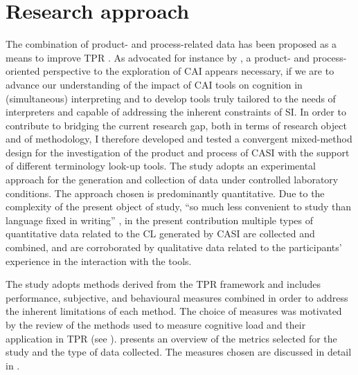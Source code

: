 \section{Research approach} \label{approach}
The combination of product- and process-related data has been proposed as a means to improve TPR \citep{hansen_2007}. As advocated for instance by \citet{mellinger_computer-assisted_2019}, a product- and process-oriented perspective to the exploration of CAI appears necessary, if we are to advance our understanding of the impact of CAI tools on cognition in (simultaneous) interpreting and to develop tools truly tailored to the needs of interpreters and capable of addressing the inherent constraints of SI. In order to contribute to bridging the current research gap, both in terms of research object and of methodology, I therefore developed and tested a convergent mixed-method design for the investigation of the product and process of CASI with the support of different terminology look-up tools. The study adopts an experimental approach for the generation and collection of data under controlled laboratory conditions. The approach chosen is predominantly quantitative. Due to the complexity of the present object of study, ``so much less convenient to study than language fixed in writing'' \citep[48]{pochhacker_introducing_2004}, in the present contribution
multiple types of quantitative data related to the CL generated by CASI are collected and combined, and are corroborated by qualitative data related to the participants' experience in the interaction with the tools.

The study adopts methods derived from the TPR framework and includes performance, subjective, and behavioural measures combined in order to address the inherent limitations of each method. The choice of measures was motivated by the review of the methods used to measure cognitive load and their application in TPR (see ).  presents an overview of the metrics selected for the study and the type of data collected. The measures chosen are discussed in detail in .


